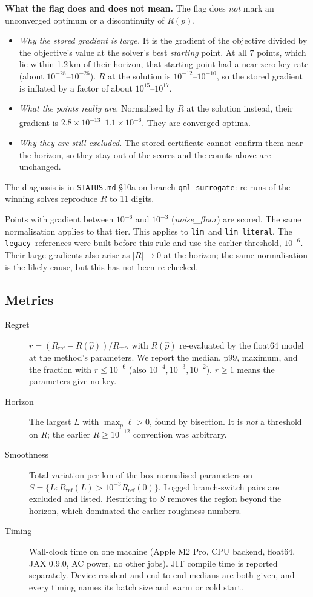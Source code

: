 \documentclass[11pt,a4paper]{article}
\newcommand{\typed}{\textsuperscript{\dag}}
\newcommand{\plim}{\texttt{lim}}
\newcommand{\limlit}{\texttt{lim\_literal}}
\newcommand{\legacy}{\texttt{legacy}}
\begin{document}
\textbf{What the flag does and does not mean.} The flag does \emph{not} mark an unconverged optimum or a
discontinuity of $R(p)$.
\begin{itemize}
\item \emph{Why the stored gradient is large.} It is the gradient of the objective divided by the objective's value
  at the solver's best \emph{starting} point. At all 7 points, which lie within 1.2\,km of their horizon, that
  starting point had a near-zero key rate (about $10^{-28}$--$10^{-26}$). $R$ at the solution is
  $10^{-12}$--$10^{-10}$, so the stored gradient is inflated by a factor of about $10^{15}$--$10^{17}$.
\item \emph{What the points really are.} Normalised by $R$ at the solution instead, their gradient is
  $2.8\times10^{-13}$--$1.1\times10^{-6}$\typed. They are converged optima.
\item \emph{Why they are still excluded.} The stored certificate cannot confirm them near the horizon, so they stay
  out of the scores and the counts above are unchanged.
\end{itemize}
The diagnosis is in \texttt{STATUS.md} \S10a on branch \texttt{qml-surrogate}: re-runs of the winning solves
reproduce $R$ to 11 digits.

Points with gradient between $10^{-6}$ and $10^{-3}$ (\emph{noise\_floor}) are scored. The same normalisation
applies to that tier. This applies to \plim\ and \limlit. The \legacy\ references were built before this rule and use
the earlier threshold, $10^{-6}$. Their large gradients also arise as $|R|\to0$ at the horizon; the same
normalisation is the likely cause, but this has not been re-checked.

\subsection{Metrics}
\begin{description}
\item[Regret] $r=(R_{\mathrm{ref}}-R(\hat p))/R_{\mathrm{ref}}$, with $R(\hat p)$ re-evaluated by the float64
  model at the method's parameters. We report the median, p99, maximum, and the fraction with $r\le10^{-6}$
  (also $10^{-4},10^{-3},10^{-2}$). $r\ge1$ means the parameters give no key.
\item[Horizon] The largest $L$ with $\max_p\ell>0$, found by bisection. It is \emph{not} a threshold on $R$; the
  earlier $R\ge10^{-12}$ convention was arbitrary.
\item[Smoothness] Total variation per km of the box-normalised parameters on
  $S=\{L:R_{\mathrm{ref}}(L)>10^{-3}R_{\mathrm{ref}}(0)\}$. Logged branch-switch pairs are excluded and listed.
  Restricting to $S$ removes the region beyond the horizon, which dominated the earlier roughness numbers.
\item[Timing] Wall-clock time on one machine (Apple M2 Pro, CPU backend, float64, JAX 0.9.0, AC power, no other
  jobs). JIT compile time is reported separately. Device-resident and end-to-end medians are both given, and every
  timing names its batch size and warm or cold start.
\end{description}
\end{document}
